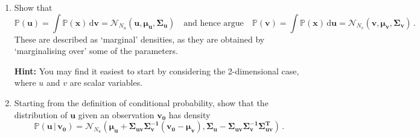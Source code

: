 \documentclass[a4paper,11pt]{article}
\newenvironment{hint}{
	\begin{mdframed}[backgroundcolor=gray!10,roundcorner=5pt]\textbf{Hint:} }{
	\end{mdframed}}
\begin{document}
\begin{enumerate}[resume]
\begin{enumerate}
\begin{hint}
You will need the following property of determinants:\[\left|\left(\begin{array}{cc}\mathbf{A}&\mathbf{B}\\\mathbf{C}&\mathbf{D}\end{array}\right)\right| = \left|\mathbf{A}\right|\left|\mathbf{D}-\mathbf{CA^{-1}B}\right| = \left|\mathbf{D}\right|\left|\mathbf{A}-\mathbf{CD^{-1}B}\right|\,.\]
\end{hint}
\pagebreak
\item Show that 
\[\mathbb{P}(\mathbf{u}) = \int \mathbb{P}(\mathbf{x})\,\mathrm{d}\mathbf{v} =\mathcal{N}_{N_u}(\mathbf{u},\boldsymbol{\mu}_\mathbf{u},\boldsymbol{\Sigma}_\mathbf{u}) \quad \textrm{and hence argue}\quad
\mathbb{P}(\mathbf{v}) = \int \mathbb{P}(\mathbf{x})\,\mathrm{d}\mathbf{u}=\mathcal{N}_{N_v}(\mathbf{v},\boldsymbol{\mu}_\mathbf{v},\boldsymbol{\Sigma}_\mathbf{v})\,.\]
These are described as `marginal' densities, as they are obtained by `marginalising over' some of the parameters.
\begin{hint}
You may find it easiest to start by considering the 2-dimensional case, where $u$ and $v$ are scalar variables.
\end{hint}
\item \label{q:condgauss} Starting from the definition of conditional probability, show that the distribution of $\mathbf{u}$ given an observation $\mathbf{v_0}$ has density
\[\mathbb{P}(\mathbf{u}\,|\,\mathbf{v_0}) = \mathcal{N}_{N_u}\left(\boldsymbol{\mu}_\mathbf{u}+\boldsymbol{\Sigma}_\mathbf{uv}\boldsymbol{\Sigma}_\mathbf{v}^\mathbf{-1}\left(\mathbf{v_0}-\boldsymbol{\mu}_\mathbf{v}\right),\boldsymbol{\Sigma}_\mathbf{u}-\boldsymbol{\Sigma}_\mathbf{uv}\boldsymbol{\Sigma}_\mathbf{v}^\mathbf{-1}\boldsymbol{\Sigma}_\mathbf{uv}^\mathbf{T}\right)\,. \]
\end{enumerate}
\end{enumerate}

 
\end{document}
